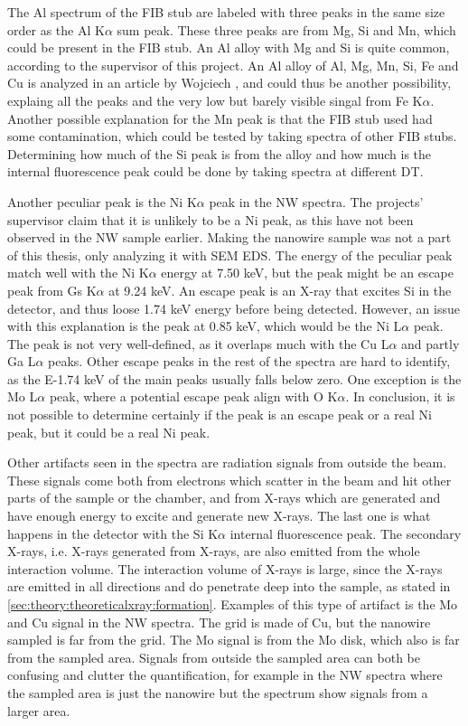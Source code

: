 The Al spectrum of the FIB stub are labeled with three peaks in the same size order as the Al K$\alpha$ sum peak.
These three peaks are from Mg, Si and Mn, which could be present in the FIB stub.
An Al alloy with Mg and Si is quite common, according to the supervisor of this project.
An Al alloy of Al, Mg, Mn, Si, Fe and Cu is analyzed in an article by Wojciech \cite{al_alloy}, and could thus be another possibility, explaing all the peaks and the very low but barely visible singal from Fe K$\alpha$.
Another possible explanation for the Mn peak is that the FIB stub used had some contamination, which could be tested by taking spectra of other FIB stubs.
Determining how much of the Si peak is from the alloy and how much is the internal fluorescence peak could be done by taking spectra at different DT.


Another peculiar peak is the Ni K$\alpha$ peak in the NW spectra.
The projects' supervisor claim that it is unlikely to be a Ni peak, as this have not been observed in the NW sample earlier.
Making the nanowire sample was not a part of this thesis, only analyzing it with SEM EDS.
The energy of the peculiar peak match well with the Ni K$\alpha$ energy at 7.50 keV, but the peak might be an escape peak from Gs K$\alpha$ at 9.24 keV.
An escape peak is an X-ray that excites Si in the detector, and thus loose 1.74 keV energy before being detected.
However, an issue with this explanation is the peak at 0.85 keV, which would be the Ni L$\alpha$ peak.
The peak is not very well-defined, as it overlaps much with the Cu L$\alpha$  and partly Ga L$\alpha$ peaks.
Other escape peaks in the rest of the spectra are hard to identify, as the E-1.74 keV of the main peaks usually falls below zero.
One exception is the Mo L$\alpha$ peak, where a potential escape peak align with O K$\alpha$.
In conclusion, it is not possible to determine certainly if the peak is an escape peak or a real Ni peak, but it could be a real Ni peak.



Other artifacts seen in the spectra are radiation signals from outside the beam.
These signals come both from electrons which scatter in the beam and hit other parts of the sample or the chamber, and from X-rays which are generated and have enough energy to excite and generate new X-rays.
The last one is what happens in the detector with the Si K$\alpha$ internal fluorescence peak.
The secondary X-rays, i.e. X-rays generated from X-rays, are also emitted from the whole interaction volume.
The interaction volume of X-rays is large, since the X-rays are emitted in all directions and do penetrate deep into the sample, as stated in \cref{sec:theory:theoreticalxray:formation}.
Examples of this type of artifact is the Mo and Cu signal in the NW spectra.
The grid is made of Cu, but the nanowire sampled is far from the grid.
The Mo signal is from the Mo disk, which also is far from the sampled area.
Signals from outside the sampled area can both be confusing and clutter the quantification, for example in the NW spectra where the sampled area is just the nanowire but the spectrum show signals from a larger area.


